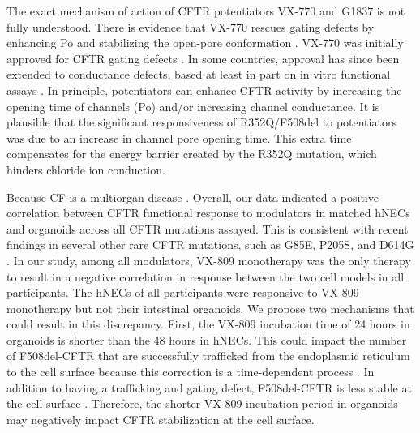 The exact mechanism of action of CFTR potentiators VX-770 and G1837 is not fully understood. There is evidence that VX-770 rescues gating defects by enhancing Po and stabilizing the open-pore conformation \cite{jih2017}. VX-770 was initially approved for CFTR gating defects \cite{fda_kalydeco_approval}. In some countries, approval has since been extended to conductance defects, based at least in part on in vitro functional assays \cite{vangoor2014, fda_kalydeco_2_years_or_older}. In principle, potentiators can enhance CFTR activity by increasing the opening time of channels (Po) and/or increasing channel conductance. It is plausible that the significant responsiveness of R352Q/F508del to potentiators was due to an increase in channel pore opening time. This extra time compensates for the energy barrier created by the R352Q mutation, which hinders chloride ion conduction.

Because CF is a multiorgan disease \cite{ratjen2015}. Overall, our data indicated a positive correlation between CFTR functional response to modulators in matched hNECs and organoids across all CFTR mutations assayed. This is consistent with recent findings in several other rare CFTR mutations, such as G85E, P205S, and D614G \cite{silva2021}. In our study, among all modulators, VX-809 monotherapy was the only therapy to result in a negative correlation in response between the two cell models in all participants. The hNECs of all participants were responsive to VX-809 monotherapy but not their intestinal organoids. We propose two mechanisms that could result in this discrepancy. First, the VX-809 incubation time of 24 hours in organoids is shorter than the 48 hours in hNECs. This could impact the number of F508del-CFTR that are successfully trafficked from the endoplasmic reticulum to the cell surface because this correction is a time-dependent process \cite{jurkuvenaite2010}. In addition to having a trafficking and gating defect, F508del-CFTR is less stable at the cell surface \cite{gentzsch2004}. Therefore, the shorter VX-809 incubation period in organoids may negatively impact CFTR stabilization at the cell surface.

